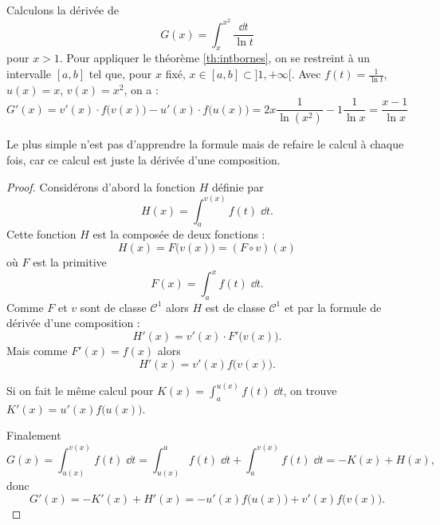 \documentclass[class=report,crop=false]{standalone}
\begin{document}
\begin{exemple}
Calculons la dérivée de 
$$G(x) = \int_x^{x^2} \frac{\dd t}{\ln t}$$
pour $x > 1$.
 Pour appliquer le théorème
\ref{th:intbornes}, on se restreint à un intervalle $[a,b]$ tel que, pour $x$ fixé, 
$x \in [a,b] \subset ]1,+\infty[$.
Avec $f(t) = \frac{1}{\ln t}$, $u(x)=x$, $v(x)= x^2$,  on a :
$$G'(x) 
=  v'(x) \cdot f\big(v(x)\big )  - u'(x) \cdot f\big(u(x)\big )
= 2x \frac{1}{\ln (x^2)} - 1 \frac{1}{\ln x}
= \frac{x-1}{\ln x}$$
\end{exemple}


Le plus simple n'est pas d'apprendre la formule mais de refaire le calcul à chaque fois,
car ce calcul est juste la dérivée d'une composition.

\begin{proof}
Considérons d'abord la fonction $H$ définie par
$$H(x) = \int_{a}^{v(x)} f(t)\;\dd t.$$
Cette fonction $H$ est la composée de deux fonctions :
$$H(x) = F \big( v(x) \big) = (F \circ v) (x) $$
où $F$ est la primitive 
$$F(x) = \int_{a}^{x} f(t)\;\dd t.$$
Comme $F$ et $v$ sont de classe $\mathcal{C}^1$ alors $H$ est de classe $\mathcal{C}^1$ et
par la formule de dérivée d'une composition :
$$H'(x) = v'(x) \cdot F' \big( v(x) \big).$$
Mais comme $F'(x) = f(x)$ alors 
$$H'(x) = v'(x) f \big( v(x) \big).$$


Si on fait le même calcul pour $K(x)= \int_{a}^{u(x)} f(t)\;\dd t$,
on trouve $K'(x) = u'(x) f \big( u(x) \big)$.

Finalement 
$$G(x) = \int_{u(x)}^{v(x)} f(t)\;\dd t = \int_{u(x)}^a f(t)\;\dd t + \int_{a}^{v(x)} f(t)\;\dd t
= -K(x)+H(x),$$
donc 
$$G'(x) = -K'(x)+H'(x) = -u'(x) f \big( u(x) \big)+v'(x) f \big( v(x) \big).$$
\end{proof}


\end{document}
